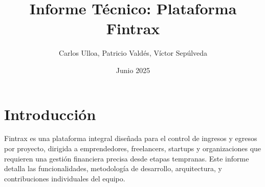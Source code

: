 \documentclass[12pt, a4paper]{article}
\title{Informe Técnico: Plataforma Fintrax}
\author{Carlos Ulloa, Patricio Valdés, Víctor Sepúlveda}
\date{Junio 2025}
\begin{document}
\maketitle
\newpage
\section{Introducción}
Fintrax es una plataforma integral diseñada para el control de ingresos y egresos por proyecto, dirigida a emprendedores, freelancers, startups y organizaciones que requieren una gestión financiera precisa desde etapas tempranas. Este informe detalla las funcionalidades, metodología de desarrollo, arquitectura, y contribuciones individuales del equipo.
\newpage
% 
\end{document}
